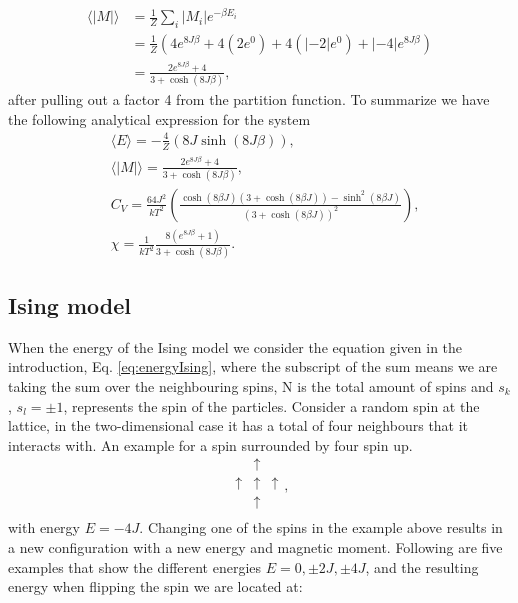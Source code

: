 \documentclass{emulateapj}
\begin{document}
\begin{align*}
    \langle |M| \rangle &= \frac{1}{Z} \sum_i |M_i| e^{-\beta E_i} \\
     &= \frac{1}{Z}\left(4e^{8J\beta} + 4\left(2e^{0}\right) + 4\left(|-2|e^0\right) + |-4|e^{8J\beta} \right) \\
     &= \frac{2e^{8J\beta} + 4}{3 + \cosh\left(8J\beta\right)},
\end{align*}
%
after pulling out a factor 4 from the partition function. To summarize we have the following analytical expression for the system
%
\begin{align*}
    &\langle E \rangle = -\frac{4}{Z}\left(8J\sinh\left(8J\beta\right)\right), \\
    &\langle |M| \rangle = \frac{2e^{8J\beta} + 4}{3 + \cosh\left(8J\beta\right)}, \\
    &C_V = \frac{64J^2}{k T^2} \left(\frac{\cosh(8\beta J)(3+\cosh(8 \beta J)) - \sinh^2(8\beta J)}{\left(3 + \cosh(8\beta J)\right)^2}\right), \\
    &\chi = \frac{1}{kT^2}\frac{8\left(e^{8J\beta} + 1\right)}{3 + \cosh\left(8J\beta\right)}.
\end{align*}

\subsection{Ising model}
When the energy of the Ising model we consider the equation given in the introduction, Eq. \eqref{eq:energyIsing}, where the subscript of the sum means we are taking the sum over the neighbouring spins, N is the total amount of spins and $s_k$, $s_l = \pm 1$, represents the spin of the particles. Consider a random spin at the lattice, in the two-dimensional case it has a total of four neighbours that it interacts with.  An example for a spin surrounded by four spin up.
%
\begin{equation*}
    \begin{matrix}
    & \uparrow & \\
    \uparrow & \uparrow & \uparrow \\
    & \uparrow & \\
    \end{matrix},
\end{equation*}
%
with energy $E = -4J$. Changing one of the spins in the example above results in a new configuration with a new energy and magnetic moment. Following are five examples that show the different energies $E = 0, \pm 2J, \pm 4J$, and the resulting energy when flipping the spin we are located at:
\end{document}
